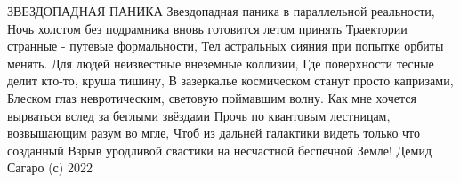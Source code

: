  
 
 
 
 

ЗВЕЗДОПАДНАЯ ПАНИКА
Звездопадная паника
в параллельной реальности,
Ночь холстом без подрамника
вновь готовится летом принять
Траектории странные -
путевые формальности,
Тел астральных сияния
при попытке орбиты менять.
Для людей неизвестные
внеземные коллизии,
Где поверхности тесные
делит кто-то, круша тишину,
В зазеркалье космическом
станут просто капризами,
Блеском глаз невротическим,
световую поймавшим волну.
Как мне хочется вырваться
вслед за беглыми звёздами
Прочь по квантовым лестницам,
возвышающим разум во мгле,
Чтоб из дальней галактики
видеть только что созданный
Взрыв уродливой свастики
на несчастной беспечной Земле!
Демид Сагаро (с) 2022
